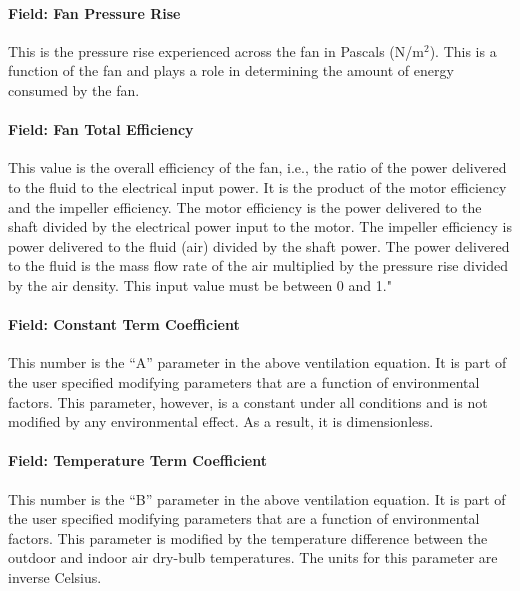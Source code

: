 \paragraph{Field: Fan Pressure Rise}\label{field-fan-pressure-rise}

This is the pressure rise experienced across the fan in Pascals (N/m\(^{2}\)). This is a function of the fan and plays a role in determining the amount of energy consumed by the fan.

\paragraph{Field: Fan Total Efficiency}\label{field-fan-total-efficiency}

This value is the overall efficiency of the fan, i.e., the ratio of the power delivered to the fluid to the electrical input power. It is the product of the motor efficiency and the impeller efficiency. The motor efficiency is the power delivered to the shaft divided by the electrical power input to the motor. The impeller efficiency is power delivered to the fluid (air) divided by the shaft power. The power delivered to the fluid is the mass flow rate of the air multiplied by the pressure rise divided by the air density. This input value must be between 0 and 1."

\paragraph{Field: Constant Term Coefficient}\label{field-constant-term-coefficient-1}

This number is the ``A'' parameter in the above ventilation equation. It is part of the user specified modifying parameters that are a function of environmental factors. This parameter, however, is a constant under all conditions and is not modified by any environmental effect. As a result, it is dimensionless.

\paragraph{Field: Temperature Term Coefficient}\label{field-temperature-term-coefficient-1}

This number is the ``B'' parameter in the above ventilation equation. It is part of the user specified modifying parameters that are a function of environmental factors. This parameter is modified by the temperature difference between the outdoor and indoor air dry-bulb temperatures. The units for this parameter are inverse Celsius.

